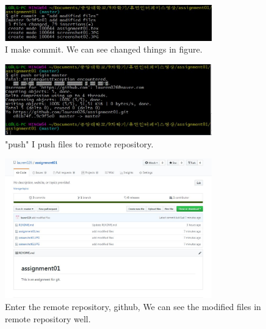 \documentclass[a4paper]{article}
\begin{document}
\begin{figure}
\begin{center}
	\includegraphics[width=0.8\textwidth]{screenshot04.JPG}
	\caption{\label{fig:screenshot04} I make commit. We can see changed things in figure.}
\end{center}
\end{figure}

\begin{figure}
\begin{center}
	\includegraphics[width=0.8\textwidth]{screenshot05.JPG}
	\caption{\label{fig:screenshot05} "push" I push files to remote repository.}
\end{center}
\end{figure}

\begin{figure}
\begin{center}
	\includegraphics[width=0.8\textwidth]{screenshot06.JPG}
	\caption{\label{fig:screenshot06} Enter the remote repository, github, We can see the modified files in remote repository well.}
\end{center}
\end{figure}
\end{document}
